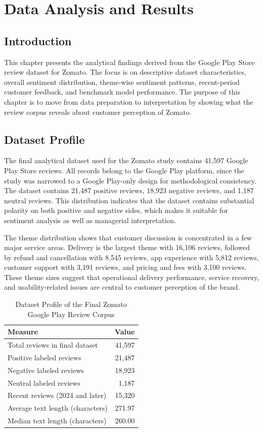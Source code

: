 \chapter{Data Analysis and Results}

\section{Introduction}

This chapter presents the analytical findings derived from the Google Play Store review dataset for Zomato. The focus is on descriptive dataset characteristics, overall sentiment distribution, theme-wise sentiment patterns, recent-period customer feedback, and benchmark model performance. The purpose of this chapter is to move from data preparation to interpretation by showing what the review corpus reveals about customer perception of Zomato.

\section{Dataset Profile}

The final analytical dataset used for the Zomato study contains 41,597 Google Play Store reviews. All records belong to the Google Play platform, since the study was narrowed to a Google Play-only design for methodological consistency. The dataset contains 21,487 positive reviews, 18,923 negative reviews, and 1,187 neutral reviews. This distribution indicates that the dataset contains substantial polarity on both positive and negative sides, which makes it suitable for sentiment analysis as well as managerial interpretation.

The theme distribution shows that customer discussion is concentrated in a few major service areas. Delivery is the largest theme with 16,106 reviews, followed by refund and cancellation with 8,545 reviews, app experience with 5,812 reviews, customer support with 3,191 reviews, and pricing and fees with 3,100 reviews. These theme sizes suggest that operational delivery performance, service recovery, and usability-related issues are central to customer perception of the brand.

\begin{table}[h]
\centering
\caption{Dataset Profile of the Final Zomato Google Play Review Corpus}
\begin{tabular}{lr}
\toprule
\textbf{Measure} & \textbf{Value} \\
\midrule
Total reviews in final dataset & 41,597 \\
Positive labeled reviews & 21,487 \\
Negative labeled reviews & 18,923 \\
Neutral labeled reviews & 1,187 \\
Recent reviews (2024 and later) & 15,320 \\
Average text length (characters) & 271.97 \\
Median text length (characters) & 260.00 \\
\bottomrule
\end{tabular}
\end{table}

